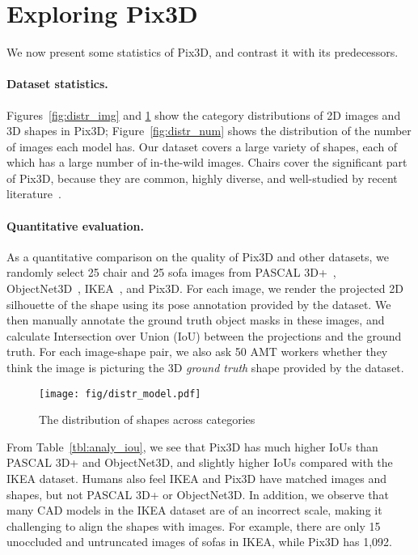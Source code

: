 \documentclass[10pt,twocolumn,letterpaper]{article}
\newcommand{\fig}[1]{Figure~\ref{#1}}
\newcommand{\figs}[1]{Figures~\ref{#1}}
\newcommand{\tbl}[1]{Table~\ref{#1}}
\newcommand{\myparagraph}[1]{\vspace{-14pt}\paragraph{#1}}
\newcommand{\data}{Pix3D\xspace}
\begin{document}
\section{Exploring \data}
\label{sec:analysis}

We now present some statistics of \data, and contrast it with its predecessors. 

\myparagraph{Dataset statistics.}

\figs{fig:distr_img} and \ref{fig:distr_model} show the category distributions of 2D images and 3D shapes in \data; \fig{fig:distr_num} shows the distribution of the number of images each model has. Our dataset covers a large variety of shapes, each of which has a large number of in-the-wild images. Chairs cover the significant part of \data, because they are common, highly diverse, and well-studied by recent literature~\cite{Dosovitskiy2016Learning,Tulsiani2017Multi,gwak2017weakly}. 
\myparagraph{Quantitative evaluation.}

As a quantitative comparison on the quality of \data and other datasets, we randomly select 25 chair and 25 sofa images from PASCAL 3D+~\cite{Xiang2014PASCAL:}, ObjectNet3D~\cite{Xiang2016Objectnet3d:}, IKEA~\cite{Lim2013Parsing}, and \data. For each image, we render the projected 2D silhouette of the shape using its pose annotation provided by the dataset. We then manually annotate the ground truth object masks in these images, and calculate Intersection over Union (IoU) between the projections and the ground truth. For each image-shape pair, we also ask 50 AMT workers whether they think the image is picturing the 3D \emph{ground truth} shape provided by the dataset.

\begin{figure}[t!]
\texttt{[image: fig/distr\_model.pdf]}
\vspace{-20pt}
\caption{The distribution of shapes across categories}
\vspace{-10pt}
\label{fig:distr_model}
\end{figure}
 
From \tbl{tbl:analy_iou}, we see that \data has much higher IoUs than PASCAL 3D+ and ObjectNet3D, and slightly higher IoUs compared with the IKEA dataset. Humans also feel IKEA and \data have matched images and shapes, but not PASCAL 3D+ or ObjectNet3D. In addition, we observe that many CAD models in the IKEA dataset are of an incorrect scale, making it challenging to align the shapes with images. For example, there are only 15 unoccluded and untruncated images of sofas in IKEA, while \data has 1,092.
\end{document}
